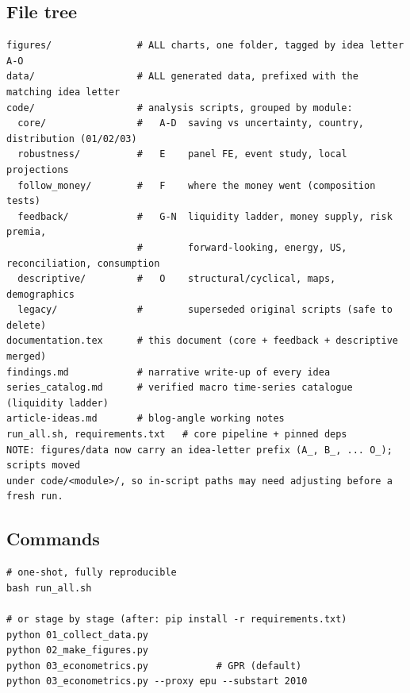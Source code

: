 \documentclass[11pt,a4paper]{article}
\begin{document}
\subsection{File tree}
\begin{lstlisting}
figures/               # ALL charts, one folder, tagged by idea letter A-O
data/                  # ALL generated data, prefixed with the matching idea letter
code/                  # analysis scripts, grouped by module:
  core/                #   A-D  saving vs uncertainty, country, distribution (01/02/03)
  robustness/          #   E    panel FE, event study, local projections
  follow_money/        #   F    where the money went (composition tests)
  feedback/            #   G-N  liquidity ladder, money supply, risk premia,
                       #        forward-looking, energy, US, reconciliation, consumption
  descriptive/         #   O    structural/cyclical, maps, demographics
  legacy/              #        superseded original scripts (safe to delete)
documentation.tex      # this document (core + feedback + descriptive merged)
findings.md            # narrative write-up of every idea
series_catalog.md      # verified macro time-series catalogue (liquidity ladder)
article-ideas.md       # blog-angle working notes
run_all.sh, requirements.txt   # core pipeline + pinned deps
NOTE: figures/data now carry an idea-letter prefix (A_, B_, ... O_); scripts moved
under code/<module>/, so in-script paths may need adjusting before a fresh run.
\end{lstlisting}

\subsection{Commands}
\begin{lstlisting}
# one-shot, fully reproducible
bash run_all.sh

# or stage by stage (after: pip install -r requirements.txt)
python 01_collect_data.py
python 02_make_figures.py
python 03_econometrics.py            # GPR (default)
python 03_econometrics.py --proxy epu --substart 2010
\end{lstlisting}
\end{document}
